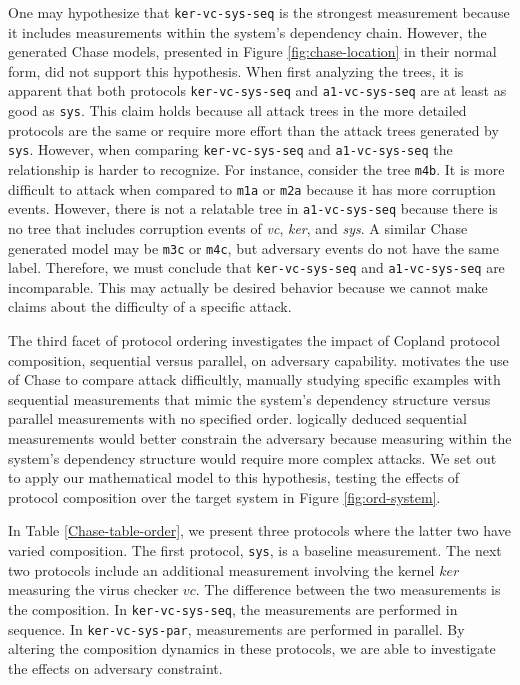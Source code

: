 \documentclass[runningheads]{llncs}
\theoremstyle{definition}
\begin{document}
One may hypothesize that \texttt{ker-vc-sys-seq} is the strongest measurement because it includes measurements within the system's dependency chain. However, the generated Chase models, presented in Figure \ref{fig:chase-location} in their normal form, did not support this hypothesis. When first analyzing the trees, it is apparent that both protocols \texttt{ker-vc-sys-seq} and \texttt{a1-vc-sys-seq} are at least as good as \texttt{sys}. This claim holds because all attack trees in the more detailed protocols are the same or require more effort than the attack trees generated by \texttt{sys}. However, when comparing \texttt{ker-vc-sys-seq} and \texttt{a1-vc-sys-seq} the relationship is harder to recognize. For instance, consider the tree \texttt{m4b}. It is more difficult to attack when compared to \texttt{m1a} or \texttt{m2a} because it has more corruption events. However, there is not a relatable tree in \texttt{a1-vc-sys-seq} because there is no tree that includes corruption events of \emph{vc}, \emph{ker}, and \emph{sys}. A similar Chase generated model may be \texttt{m3c} or \texttt{m4c}, but adversary events do not have the same label. Therefore, we must conclude that  \texttt{ker-vc-sys-seq} and \texttt{a1-vc-sys-seq} are incomparable. This may actually be desired behavior because we cannot make claims about the difficulty of a specific attack. 


The third facet of protocol ordering investigates the impact of Copland protocol composition, sequential versus parallel, on adversary capability. \citet{Rowe:2021:AutomatedTrust} motivates the use of Chase to compare attack difficultly, manually studying specific examples with sequential measurements that mimic the system's dependency structure versus parallel measurements with no specified order. \citet{Rowe:2021:AutomatedTrust} logically deduced sequential measurements would better constrain the adversary because measuring within the system's dependency structure would require more complex attacks. We set out to apply our mathematical model to this hypothesis, testing the effects of protocol composition over the target system in Figure \ref{fig:ord-system}. 

In Table \ref{Chase-table-order}, we present three protocols where the latter two have varied composition. The first protocol, \texttt{sys}, is a baseline measurement. The next two protocols include an additional measurement involving the kernel $ker$ measuring the virus checker $vc$. The difference between the two measurements is the composition. In \texttt{ker-vc-sys-seq}, the measurements are performed in sequence. In \texttt{ker-vc-sys-par}, measurements are performed in parallel. By altering the composition dynamics in these protocols, we are able to investigate the effects on adversary constraint.
\end{document}
